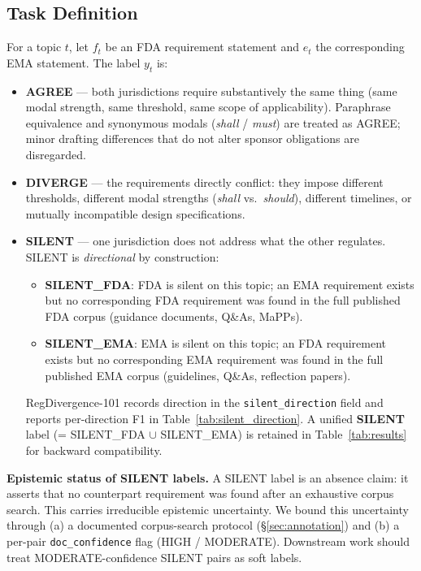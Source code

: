 \documentclass[manuscript]{acmart}
\begin{document}
\subsection{Task Definition}
\label{sec:taskdef}

For a topic $t$, let $f_t$ be an FDA requirement statement and $e_t$ the
corresponding EMA statement. The label $y_t$ is:
\begin{itemize}
\item \textbf{AGREE} --- both jurisdictions require substantively the same
  thing (same modal strength, same threshold, same scope of applicability).
  Paraphrase equivalence and synonymous modals (\textit{shall} / \textit{must})
  are treated as AGREE; minor drafting differences that do not alter sponsor
  obligations are disregarded.
\item \textbf{DIVERGE} --- the requirements directly conflict: they impose
  different thresholds, different modal strengths (\textit{shall} vs.\
  \textit{should}), different timelines, or mutually incompatible design
  specifications.
\item \textbf{SILENT} --- one jurisdiction does not address what the other
  regulates. SILENT is \textit{directional} by construction:
  \begin{itemize}
    \item \textbf{SILENT\_FDA}: FDA is silent on this topic; an EMA requirement
      exists but no corresponding FDA requirement was found in the full published
      FDA corpus (guidance documents, Q\&As, MaPPs).
    \item \textbf{SILENT\_EMA}: EMA is silent on this topic; an FDA requirement
      exists but no corresponding EMA requirement was found in the full published
      EMA corpus (guidelines, Q\&As, reflection papers).
  \end{itemize}
  RegDivergence-101 records direction in the \texttt{silent\_direction} field
  and reports per-direction F1 in Table~\ref{tab:silent_direction}. A unified
  \textbf{SILENT} label (= SILENT\_FDA $\cup$ SILENT\_EMA) is retained in
  Table~\ref{tab:results} for backward compatibility.
\end{itemize}

\textbf{Epistemic status of SILENT labels.}
A SILENT label is an absence claim: it asserts that no counterpart requirement
was found after an exhaustive corpus search. This carries irreducible epistemic
uncertainty. We bound this uncertainty through (a) a documented corpus-search
protocol (\S\ref{sec:annotation}) and (b) a per-pair \texttt{doc\_confidence}
flag (HIGH / MODERATE). Downstream work should treat MODERATE-confidence SILENT
pairs as soft labels.
\end{document}
